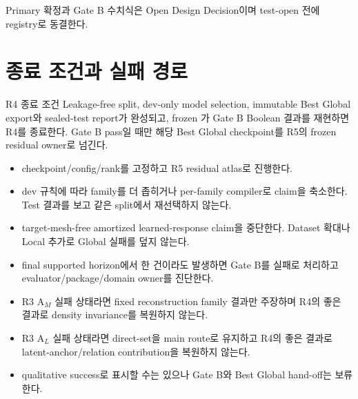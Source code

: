 \documentclass[10pt,a4paper]{article}
\begin{document}
Primary 확정과 Gate B 수치식은 Open Design Decision이며 test-open 전에 registry로 동결한다.

\section{종료 조건과 실패 경로}
\label{sec:r4-chapter-8}

\begin{contractbox}{R4 종료 조건}
Leakage-free split, dev-only model selection, immutable Best Global export와 sealed-test report가 완성되고,
frozen 가 Gate B Boolean 결과를 재현하면 R4를 종료한다.
Gate B pass일 때만 해당 Best Global checkpoint를 R5의 frozen residual owner로 넘긴다.
\end{contractbox}

\begin{itemize}
  \item {} checkpoint/config/rank를 고정하고 R5 residual atlas로 진행한다.
  \item {} dev 규칙에 따라 family를 더 좁히거나
  per-family compiler로 claim을 축소한다. Test 결과를 보고 같은 split에서 재선택하지 않는다.
  \item {} target-mesh-free amortized learned-response claim을 중단한다.
  Dataset 확대나 Local 추가로 Global 실패를 덮지 않는다.
  \item {} final supported horizon에서 한 건이라도 발생하면
  Gate B를 실패로 처리하고 evaluator/package/domain owner를 진단한다.
  \item {} R3 A\(_M\) 실패 상태라면 fixed reconstruction family 결과만 주장하며
  R4의 좋은 결과로 density invariance를 복원하지 않는다.
  \item {} R3 A\(_L\) 실패 상태라면 direct-set을 main route로 유지하고
  R4의 좋은 결과로 latent-anchor/relation contribution을 복원하지 않는다.
  \item {} qualitative success로 표시할 수는 있으나 Gate B와 Best Global hand-off는 보류한다.
\end{itemize}
\end{document}
